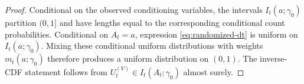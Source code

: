 \documentclass[10pt,a4paper]{amsart}
\begin{document}
\begin{proof}
Conditional on the observed conditioning variables, the intervals
$I_t(a;\gamma_0)$ partition $(0,1]$ and have lengths equal to the corresponding
conditional count probabilities. Conditional on $A_t=a$, expression
\eqref{eq:randomized-dt} is uniform on $I_t(a;\gamma_0)$. Mixing these conditional
uniform distributions with weights $m_t(a;\gamma_0)$ therefore produces a uniform
distribution on $(0,1)$. The inverse-CDF statement follows from
$U_t^{(V)}\in I_t(A_t;\gamma_0)$ almost surely.
\end{proof}
\end{document}
